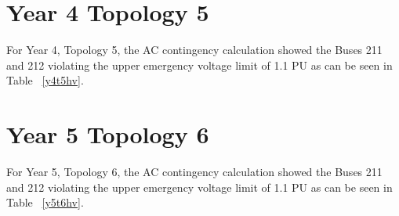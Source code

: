 \documentclass[10pt]{report}
\begin{document}
\begin{table}[H]
\caption{Upper emergency voltage range violation counts - Buses with Contingencies - Year 3, Topology 4}
\label{y3t4hv}
\centering
{}
\end{table}

\section{Year 4 Topology 5}

For Year 4, Topology 5, the AC contingency calculation showed the Buses 211 and 212 violating the upper emergency voltage limit of 1.1 PU as can be seen in Table ~\ref{y4t5hv}. 

\begin{table}[H]
\caption{Upper emergency voltage range violation counts - Buses with Contingencies - Year 4, Topology 5}
\label{y4t5hv}
\centering
{}
\end{table}

\section{Year 5 Topology 6}

For Year 5, Topology 6, the AC contingency calculation showed the Buses 211 and 212 violating the upper emergency voltage limit of 1.1 PU as can be seen in Table ~\ref{y5t6hv}. 
\end{document}
